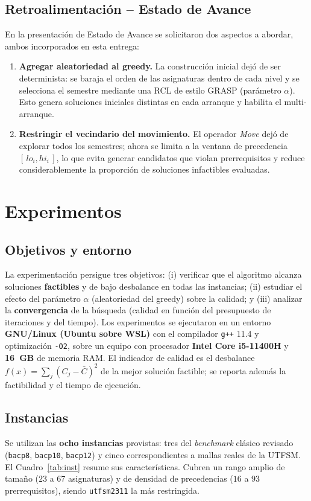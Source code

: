 \documentclass[letter, 10pt]{article}
\begin{document}
\subsection{Retroalimentaci\'on -- Estado de Avance}
\label{sec:retro}
En la presentaci\'on de Estado de Avance se solicitaron dos aspectos a abordar, ambos incorporados en esta entrega:
\begin{enumerate}
    \item \textbf{Agregar aleatoriedad al greedy.} La construcci\'on inicial dej\'o de ser determinista: se baraja el orden de las asignaturas dentro de cada nivel y se selecciona el semestre mediante una RCL de estilo GRASP (par\'ametro $\alpha$). Esto genera soluciones iniciales distintas en cada arranque y habilita el multi-arranque.
    \item \textbf{Restringir el vecindario del movimiento.} El operador \textit{Move} dej\'o de explorar todos los semestres; ahora se limita a la ventana de precedencia $[\,lo_i, hi_i\,]$, lo que evita generar candidatos que violan prerrequisitos y reduce considerablemente la proporci\'on de soluciones infactibles evaluadas.
\end{enumerate}

\section{Experimentos}
\subsection{Objetivos y entorno}
La experimentaci\'on persigue tres objetivos: (i) verificar que el algoritmo alcanza soluciones \textbf{factibles} y de bajo desbalance en todas las instancias; (ii) estudiar el efecto del par\'ametro $\alpha$ (aleatoriedad del greedy) sobre la calidad; y (iii) analizar la \textbf{convergencia} de la b\'usqueda (calidad en funci\'on del presupuesto de iteraciones y del tiempo). Los experimentos se ejecutaron en un entorno \textbf{GNU/Linux (Ubuntu sobre WSL)} con el compilador \texttt{g++} 11.4 y optimizaci\'on \texttt{-O2}, sobre un equipo con procesador \textbf{Intel Core i5-11400H} y \textbf{16~GB} de memoria RAM. El indicador de calidad es el desbalance $f(x)=\sum_j (C_j-\bar{C})^2$ de la mejor soluci\'on factible; se reporta adem\'as la factibilidad y el tiempo de ejecuci\'on.

\subsection{Instancias}
Se utilizan las \textbf{ocho instancias} provistas: tres del \emph{benchmark} cl\'asico revisado (\texttt{bacp8}, \texttt{bacp10}, \texttt{bacp12}) y cinco correspondientes a mallas reales de la UTFSM. El Cuadro~\ref{tab:inst} resume sus caracter\'isticas. Cubren un rango amplio de tama\~no ($23$ a $67$ asignaturas) y de densidad de precedencias ($16$ a $93$ prerrequisitos), siendo \texttt{utfsm2311} la m\'as restringida.
\end{document}
